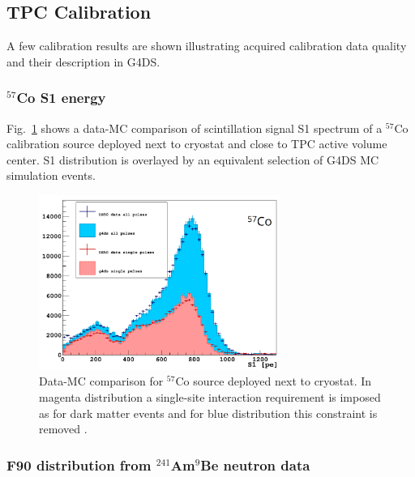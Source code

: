 \subsection{TPC Calibration}
A few calibration results are shown illustrating acquired calibration data quality and their description in G4DS.

\subsubsection{$^{57}$Co S1 energy}
Fig.~\ref{fig:CalibData:Co57} shows a data-MC comparison of scintillation signal S1 spectrum of a $^{57}$Co calibration source deployed next to cryostat and close to TPC active volume center. S1 distribution is overlayed by an equivalent selection of G4DS MC simulation events.

\begin{figure}[htbp]
\centering
\includegraphics[width=0.7\textwidth]{./Figures/57Co_Paolo_G4DS_UCLA.png}
\caption{Data-MC comparison for $^{57}$Co source deployed next to cryostat. In magenta distribution a single-site interaction requirement is imposed as for dark matter events and for blue distribution this constraint is removed \cite{DS50:G4DS:paper}.
\label{fig:CalibData:Co57}}
 \end{figure}


\subsubsection{F90 distribution from $^{241}$Am$^9$Be neutron data}\label{sec:CalibData:NR}

